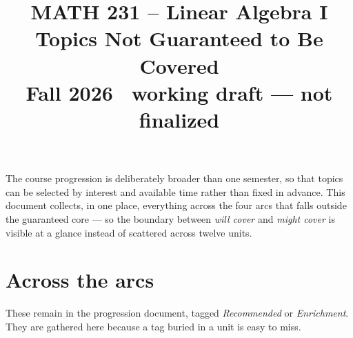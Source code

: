 \documentclass[11pt]{article}
\title{\vspace{-1.2cm}\textbf{\sffamily MATH 231 -- Linear Algebra I}\\[4pt]
       {\large\sffamily Topics Not Guaranteed to Be Covered}\\[2pt]
       {\normalsize\sffamily Fall 2026 \textbullet\ working draft --- not finalized}}
\author{}
\date{}
\begin{document}
\maketitle
\vspace{-1.3cm}

\begin{center}
\end{center}

\bigskip
\noindent The course progression is deliberately broader than one semester, so
that topics can be selected by interest and available time rather than fixed in
advance. This document collects, in one place, everything across the four arcs
that falls outside the guaranteed core --- so the boundary between
\emph{will cover} and \emph{might cover} is visible at a glance instead of
scattered across twelve units.

\section{Across the arcs}
These remain in the progression document, tagged \emph{Recommended} or
\emph{Enrichment}. They are gathered here because a tag buried in a unit is easy
to miss.
\end{document}
